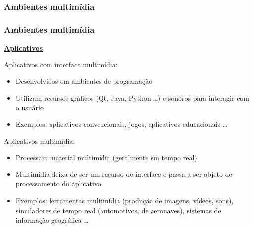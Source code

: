\documentclass[xcolor]{beamer}
\begin{document}
\begin{frame}
    \frametitle{Ambientes multimídia}

\begin{figure}[htb]
\centering
{}
\end{figure}
\end{frame}


\begin{frame}
    \frametitle{Ambientes multimídia}

    \uline{\bf Aplicativos}

    \vspace{0.25cm}

    Aplicativos com interface multimídia: 

    \begin{itemize}
        \item Desenvolvidos em ambientes de programação
        \item Utilizam recursos gráficos (Qt, Java, Python \ldots) e sonoros
para interagir com o usuário
        \item Exemplos: aplicativos convencionais, jogos, aplicativos
educacionais \ldots
    \end{itemize}

    Aplicativos multimídia:

    \begin{itemize}
        \item Processam material multimídia (geralmente em tempo real)
        \item Multimídia deixa de ser um recurso de interface e passa a ser
objeto de processamento do aplicativo
        \item Exemplos: ferramentas multimídia (produção de imagens, vídeos,
sons), simuladores de tempo real (automotivos, de aeronaves), sistemas de
informação geográfica \ldots
    \end{itemize}
\end{frame}
\end{document}
